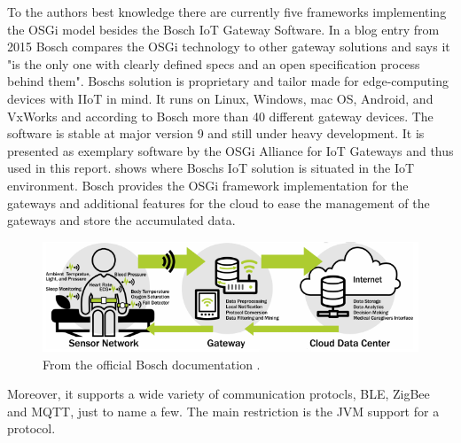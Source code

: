 To the authors best knowledge there are currently five frameworks implementing the OSGi model besides the Bosch IoT Gateway Software\cite{BoschIoT13:online}. In a blog entry from 2015 Bosch compares the OSGi technology to other gateway solutions and says it "is the only one with clearly defined specs and an open specification process behind them"\cite{boschBlogOSGi69:online}. Boschs solution is proprietary and tailor made for edge-computing devices with IIoT in mind\cite{OSGiforIoTBlog27:online}. It runs on Linux, Windows, mac OS, Android, and VxWorks and according to Bosch more than 40 different gateway devices\cite{BoschIoT13:online}. The software is stable at major version 9 and still under heavy development. It is presented as exemplary software by the OSGi Alliance for IoT Gateways \cite{exampleIoTGateweOSGi:online} and thus used in this report.  shows where Boschs IoT solution is situated in the IoT environment. Bosch provides the OSGi framework implementation for the gateways and additional features for the cloud to ease the management of the gateways and store the accumulated data.
\begin{figure}[h!]
    \centering
    \includegraphics[scale=0.8]{figures/iotSetup.png}
    \caption{From the official Bosch documentation \cite{BoschIoT13:online}.}
    \label{fig:boschIoTGatewaySetup}
\end{figure}
Moreover, it supports a wide variety of communication protocls, BLE, ZigBee and MQTT, just to name a few. The main restriction is the JVM support for a protocol.  

